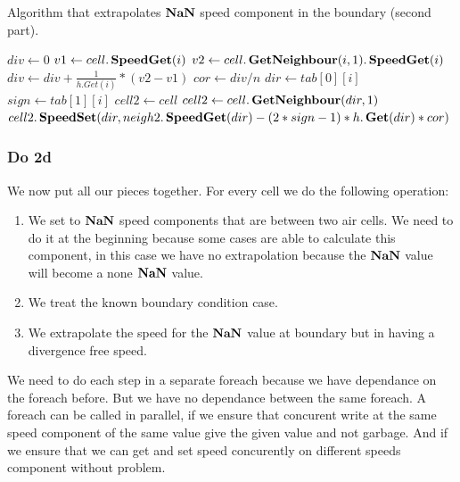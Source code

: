 \begin{algorithm}
\caption{Algorithm that extrapolates $\mathop{\textbf{NaN}}$ speed component in the boundary (second part).}
\label{code:ApplyNanExtrap2}
\begin{algorithmic}[1]
	\State $div \gets 0$ 
	\State $v1 \gets cell.\mathop{\textbf{SpeedGet}}(i)$
	\State $v2 \gets cell.\mathop{\textbf{GetNeighbour}}(i,1).\mathop{\textbf{SpeedGet}}(i)$
	\State $div \gets div+\frac{1}{h.Get(i)}*(v2-v1)$
	\EndFor
	\State $cor \gets div/n$
	\State $dir \gets tab[0][i]$
	\State $sign \gets tab[1][i]$
	\State $cell2 \gets cell$
		\State $cell2 \gets cell.\mathop{\textbf{GetNeighbour}}(dir,1)$
	\EndIf
	\State $cell2.\mathop{\textbf{SpeedSet}}(dir,neigh2.\mathop{\textbf{SpeedGet}}(dir)-(2*sign-1)*h.\mathop{\textbf{Get}}(dir)*cor)$
	\EndFor
\EndFunction
\end{algorithmic}
\end{algorithm}

\subsubsection{Do 2d}

We now put all our pieces together.
For every cell we do the following operation:
\begin{enumerate}
\item We set to $\mathop{\textbf{NaN}}$ speed components that are between two air cells.
We need to do it at the beginning because some cases are able to calculate this component,
in this case we have no extrapolation because the $\mathop{\textbf{NaN}}$ value will become a none $\mathop{\textbf{NaN}}$ value.
\item We treat the known boundary condition case.
\item We extrapolate the speed for the $\mathop{\textbf{NaN}}$ value at boundary but in having a divergence free speed.
\end{enumerate}

We need to do each step in a separate foreach because we have dependance on the foreach before.
But we have no dependance between the same foreach.
A foreach can be called in parallel, if we ensure that concurent write at the same speed component of the same value
give the given value and not garbage.
And if we ensure that we can get and set speed concurently on different speeds component without problem.

